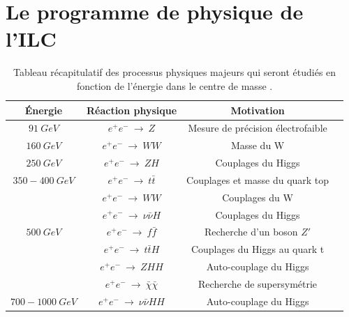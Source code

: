 \section{Le programme de physique de l'ILC}
\label{sec.phys.program}
\begin{table}[!ht]
  \begin{center}
    \begin{tabular}{c|c|c|c}
      \rowcolor{black!20!white}Énergie & Réaction physique & Motivation \\
      \hline
      \rowcolor{black!5!white}$91~GeV$ & $e^+e^-~\rightarrow~Z$ & Mesure de précision électrofaible  \\
      \hline
      \rowcolor{black!5!white}$160~GeV$ & $e^+e^-~\rightarrow~WW$ & Masse du W  \\
      \hline
      \rowcolor{black!5!white}$250~GeV$ & $e^+e^-~\rightarrow~ZH$ & Couplages du Higgs  \\
      \hline
      \rowcolor{black!5!white}$350-400~GeV$ & $e^+e^-~\rightarrow~t\bar t$ & Couplages et masse du quark top  \\
      \rowcolor{black!5!white}$ $ & $e^+e^-~\rightarrow~WW$ & Couplages du W  \\
      \rowcolor{black!5!white}$ $ & $e^+e^-~\rightarrow~\nu\bar{\nu}H$ & Couplages du Higgs  \\
      \hline
      \rowcolor{black!5!white}$500~GeV$ & $e^+e^-~\rightarrow~f\bar f$ & Recherche d'un boson $Z'$  \\
      \rowcolor{black!5!white}$ $ & $e^+e^-~\rightarrow~t\bar tH$ & Couplages du Higgs au quark t  \\
      \rowcolor{black!5!white}$ $ & $e^+e^-~\rightarrow~ZHH$ & Auto-couplage du Higgs  \\
      \rowcolor{black!5!white}$ $ & $e^+e^-~\rightarrow~\bar{\chi}\bar{\chi}$ & Recherche de supersymétrie  \\
      \hline
      \rowcolor{black!5!white}$700-1000~GeV$ & $e^+e^-~\rightarrow~\nu\bar{\nu}HH$ & Auto-couplage du Higgs  \\
    \end{tabular}
  \end{center}  
  \caption{Tableau récapitulatif des processus physiques majeurs qui seront étudiés en fonction de l'énergie dans le centre de masse \cite{physicsTDR}.}
  \label{tab.physic_summary}
\end{table}
